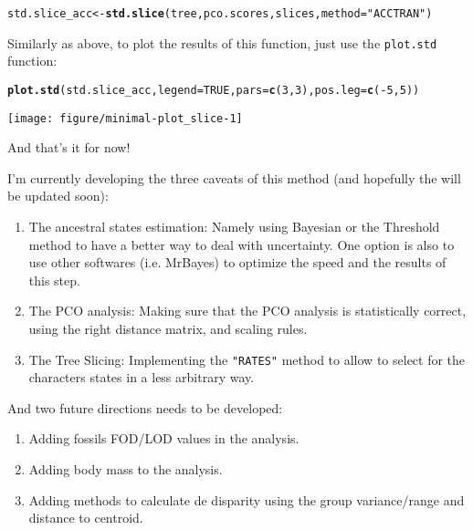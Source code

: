 \documentclass[a4paper,11pt]{article}\usepackage[]{graphicx}\usepackage[]{color}
\makeatletter
\def\maxwidth{ %
  \ifdim\Gin@nat@width>\linewidth
    \linewidth
  \else
    \Gin@nat@width
  \fi
}
\newcommand{\hlnum}[1]{\textcolor[rgb]{0.686,0.059,0.569}{#1}}%
\newcommand{\hlstr}[1]{\textcolor[rgb]{0.192,0.494,0.8}{#1}}%
\newcommand{\hlopt}[1]{\textcolor[rgb]{0,0,0}{#1}}%
\newcommand{\hlstd}[1]{\textcolor[rgb]{0.345,0.345,0.345}{#1}}%
\newcommand{\hlkwb}[1]{\textcolor[rgb]{0.69,0.353,0.396}{#1}}%
\newcommand{\hlkwc}[1]{\textcolor[rgb]{0.333,0.667,0.333}{#1}}%
\newcommand{\hlkwd}[1]{\textcolor[rgb]{0.737,0.353,0.396}{\textbf{#1}}}%
\newenvironment{kframe}{%
 \def\at@end@of@kframe{}%
 \ifinner\ifhmode%
  \def\at@end@of@kframe{\end{minipage}}%
  \begin{minipage}{\columnwidth}%
 \fi\fi%
 \def\FrameCommand##1{\hskip\@totalleftmargin \hskip-\fboxsep
 \colorbox{shadecolor}{##1}\hskip-\fboxsep
     \hskip-\linewidth \hskip-\@totalleftmargin \hskip\columnwidth}%
 \MakeFramed {\advance\hsize-\width
   \@totalleftmargin\z@ \linewidth\hsize
   \@setminipage}}%
 {\par\unskip\endMakeFramed%
 \at@end@of@kframe}
\newenvironment{knitrout}{}{} %
\makeatother
\begin{document}
\begin{knitrout}
\color{fgcolor}\begin{kframe}
\begin{alltt}
\hlstd{std.slice_acc}\hlkwb{<-}\hlkwd{std.slice}\hlstd{(tree, pco.scores, slices,} \hlkwc{method}\hlstd{=}\hlstr{"ACCTRAN"}\hlstd{)}
\end{alltt}
\end{kframe}
\end{knitrout}

Similarly as above, to plot the results of this function, just use the \texttt{plot.std} function:

\begin{knitrout}
\color{fgcolor}\begin{kframe}
\begin{alltt}
\hlkwd{plot.std}\hlstd{(std.slice_acc,} \hlkwc{legend}\hlstd{=}\hlnum{TRUE}\hlstd{,} \hlkwc{pars}\hlstd{=}\hlkwd{c}\hlstd{(}\hlnum{3}\hlstd{,}\hlnum{3}\hlstd{),} \hlkwc{pos.leg}\hlstd{=}\hlkwd{c}\hlstd{(}\hlopt{-}\hlnum{5}\hlstd{,}\hlnum{5}\hlstd{))}
\end{alltt}


{\ttfamily\noindent{}}\end{kframe}

{\centering \texttt{[image: figure/minimal-plot\_slice-1]} 

}



\end{knitrout}

And that's it for now!

I'm currently developing the three caveats of this method (and hopefully the will be updated soon):
\begin{enumerate}
\item{The ancestral states estimation:} Namely using Bayesian or the Threshold method to have a better way to deal with uncertainty. One option is also to use other softwares (i.e. MrBayes) to optimize the speed and the results of this step.
\item{The PCO analysis:} Making sure that the PCO analysis is statistically correct, using the right distance matrix, and scaling rules.
\item{The Tree Slicing:} Implementing the \texttt{"RATES"} method to allow to select for the characters states in a less arbitrary way.
\end{enumerate}
And two future directions needs to be developed:
\begin{enumerate}
\item{Adding fossils FOD/LOD values in the analysis.}
\item{Adding body mass to the analysis.}
\item{Adding methods to calculate de disparity using the group variance/range and distance to centroid.}
\end{enumerate}
\end{document}
